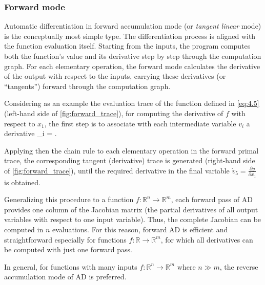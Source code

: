 \subsubsection{Forward mode}
\label{subsubsec:forward_mode}
Automatic differentiation in forward accumulation mode (or \emph{tangent linear} mode) is the conceptually most simple type. The differentiation process is aligned with the function evaluation itself. Starting from the inputs, the program computes both the function's value and its derivative step by step through the computation graph. For each elementary operation, the forward mode calculates the derivative of the output with respect to the inputs, carrying these derivatives (or ``tangents'') forward through the computation graph.

Considering as an example the evaluation trace of the function defined in \cref{eq:4.5} (left-hand side of \cref{fig:forward_trace}), for computing the derivative of $f$ with respect to $x_1$, the first step is to associate with each intermediate variable $v_i$ a derivative
\be
\label{eq:4.6}
_i = .
\ee

Applying then the chain rule to each elementary operation in the forward primal trace, the corresponding tangent (derivative) trace is generated (right-hand side of \cref{fig:forward_trace}), until the required derivative in the final variable $\Dot{v}_5 = \frac{\partial y}{\partial x_1}$ is obtained.

Generalizing this procedure to a function $f : \mathbb{R}^n \rightarrow \mathbb{R}^m$, each forward pass of AD provides one column of the Jacobian matrix (\ie the partial derivatives of all output variables with respect to one input variable).
Thus, the complete Jacobian can be computed in $n$ evaluations. For this reason, forward AD is efficient and straightforward especially for functions $f : \mathbb{R} \rightarrow \mathbb{R}^m$, for which all derivatives can be computed with just one forward pass.

In general, for functions with many inputs $f : \mathbb{R}^n \rightarrow \mathbb{R}^m$ where $n \gg m$, the reverse accumulation mode of AD is preferred.

